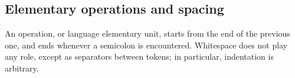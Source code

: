 \subsection{Elementary operations and spacing}
An operation, or language elementary unit, starts from the end of the previous one, and ends whenever a semicolon is encountered. Whitespace does not play any role, except as separators between tokens; in particular, indentation is arbitrary.
